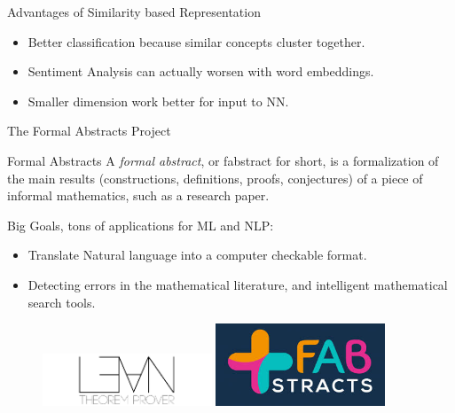 \documentclass[handout]{beamer}
\begin{document}
\begin{frame}{Advantages of Similarity based Representation}

    \begin{itemize}
        \item Better classification because similar concepts cluster together.
        \item Sentiment Analysis can actually worsen with word embeddings.
        \item Smaller dimension work better for input to NN.
    \end{itemize}
\end{frame}

\begin{frame}{The Formal Abstracts Project}
    \begin{block}{Formal Abstracts}
        A \textit{formal abstract}, or fabstract for short, is a formalization of the main results (constructions, definitions, proofs, conjectures) of a piece of informal mathematics, such as a research paper.
    \end{block}
    Big Goals, tons of applications for ML and NLP:
    \begin{itemize}
            \item Translate Natural language into a computer checkable format.
            \item Detecting errors in the mathematical literature, and intelligent mathematical search tools.
    \end{itemize}
\begin{figure}
   \includegraphics[width=0.45\textwidth]{lean_website.png}
   \hfill
   \includegraphics[width=0.45\textwidth]{fabstract_log.jpeg}
\end{figure}
\end{frame}
\end{document}
